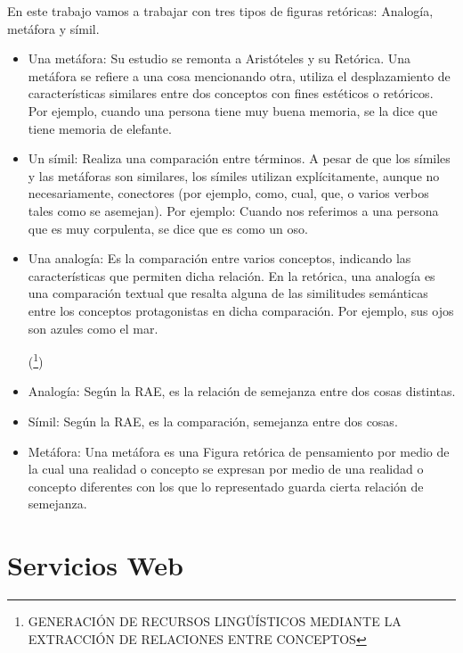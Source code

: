 En este trabajo vamos a trabajar con tres tipos de figuras retóricas: Analogía, metáfora y símil.
\begin{itemize}
	\item Una metáfora: Su estudio se remonta a Aristóteles y su Retórica. Una metáfora se refiere a una cosa mencionando otra, utiliza el desplazamiento de características similares entre dos conceptos con fines estéticos o retóricos. Por ejemplo, cuando una persona tiene muy buena memoria, se la dice que tiene memoria de elefante.
	
	\item Un símil: Realiza una comparación entre términos. A pesar de que los símiles y las metáforas son similares, los símiles utilizan explícitamente, aunque no necesariamente, conectores (por ejemplo, como, cual, que, o varios verbos tales como se asemejan).
	Por ejemplo: Cuando nos referimos a una persona que es muy corpulenta, se dice que es como un oso.
	
	\item Una analogía: Es la comparación entre varios conceptos, indicando las características que permiten dicha relación. En la retórica, una analogía es una comparación textual que resalta alguna de las similitudes semánticas entre los conceptos protagonistas en dicha comparación. Por ejemplo, sus ojos son azules como el mar.
	
	(\footnote {GENERACIÓN DE RECURSOS LINGÜÍSTICOS MEDIANTE LA EXTRACCIÓN DE RELACIONES ENTRE CONCEPTOS})	
	
\end{itemize}

\begin{itemize}
	\item Analogía: Según la RAE, es la relación de semejanza entre dos cosas distintas.
	\item Símil: Según la RAE, es la comparación, semejanza entre dos cosas.
	\item Metáfora: Una metáfora es una Figura retórica de pensamiento por medio de la cual una realidad o concepto se expresan por medio de una realidad o concepto diferentes con los que lo representado guarda cierta relación de semejanza.
\end{itemize}



\section{Servicios Web}
\label{cap:sec:servicios_web}

